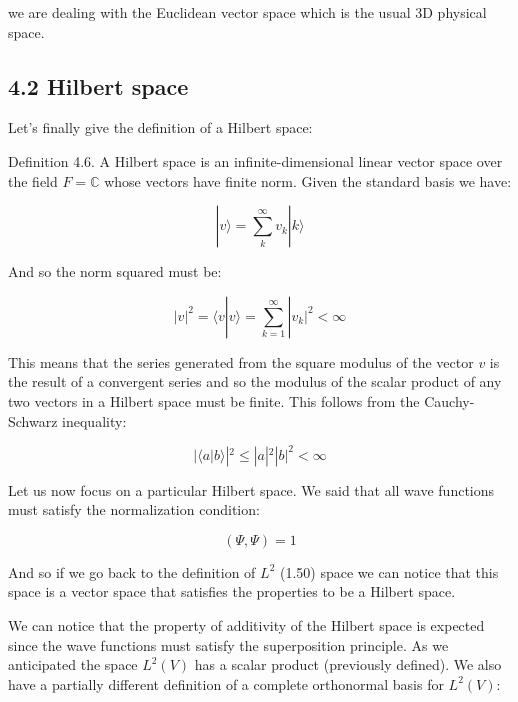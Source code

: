 \documentclass[10pt]{article}
\begin{document}
we are dealing with the Euclidean vector space which is the usual 3D physical space.


\subsection*{4.2 Hilbert space}

Let's finally give the definition of a Hilbert space:

Definition 4.6. A Hilbert space is an infinite-dimensional linear vector space over the field $F = \mathbb{C}$ whose vectors have finite norm. Given the standard basis we have:

\begin{equation*}
|v\rangle = \sum_{k}^{\infty} v_k|k\rangle \tag{4.13}
\end{equation*}

And so the norm squared must be:

\begin{equation*}
|v|^2 = \langle v|v\rangle = \sum_{k=1}^{\infty}|v_k|^2 < \infty \tag{4.14}
\end{equation*}

This means that the series generated from the square modulus of the vector $v$ is the result of a convergent series and so the modulus of the scalar product of any two vectors in a Hilbert space must be finite. This follows from the Cauchy-Schwarz inequality:

\begin{equation*}
|\langle a|b\rangle|^2 \leq |a|^2|b|^2 < \infty \tag{4.15}
\end{equation*}

Let us now focus on a particular Hilbert space. We said that all wave functions must satisfy the normalization condition:

\begin{equation*}
(\Psi, \Psi) = 1 \tag{4.16}
\end{equation*}

And so if we go back to the definition of $L^2$ (1.50) space we can notice that this space is a vector space that satisfies the properties to be a Hilbert space.

We can notice that the property of additivity of the Hilbert space is expected since the wave functions must satisfy the superposition principle. As we anticipated the space $L^2(V)$ has a scalar product (previously defined). We also have a partially different definition of a complete orthonormal basis for $L^2(V)$:
\end{document}
